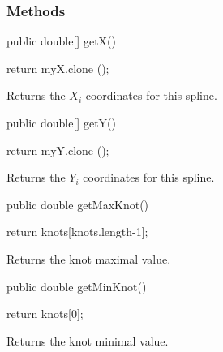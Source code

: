 \subsubsection* {Methods}

\begin{code}

   public double[] getX()\begin{hide} {
      return myX.clone ();
   }\end{hide}
\end{code}
\begin{tabb}   Returns the $X_i$ coordinates for this spline.
\end{tabb}
\begin{htmlonly}
\end{htmlonly}
\begin{code}

   public double[] getY()\begin{hide} {
      return myY.clone ();
   }\end{hide}
\end{code}
\begin{tabb}
   Returns the $Y_i$ coordinates for this spline.
\end{tabb}
\begin{htmlonly}
\end{htmlonly}
\begin{code}

   public double getMaxKnot()\begin{hide} {
      return knots[knots.length-1];
   }\end{hide}
\end{code}
\begin{tabb}
   Returns the knot maximal value.
\end{tabb}
\begin{htmlonly}
\end{htmlonly}
\begin{code}

   public double getMinKnot()\begin{hide} {
      return knots[0];
   }\end{hide}
\end{code}
\begin{tabb}
   Returns the knot minimal value.
\end{tabb}
\begin{htmlonly}
\end{htmlonly}
